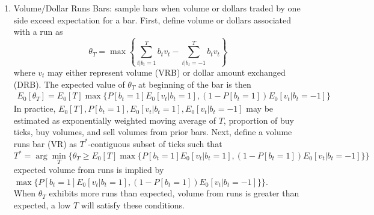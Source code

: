 \begin{remark}
\begin{enumerate}[label=\roman*.]
\begin{equation*}
\end{equation*}
The expected value of $\theta_T$ at beginning of bar is computed as
\begin{equation*}
E_0[\theta_T] = E_0[T] \max \{P[b_t = 1], 1 - P[b_t = 1] \} \nonumber
\end{equation*}
In practice, $E_0[T]$ and $P[b_t = 1]$ may be estimated as exponentially weighted moving average of $T$ and proportion of buy ticks from prior bars. Next, define TRB as $T^*$-contiguous subset of ticks such that
\begin{equation*}
T^* = \arg \min_T \{ \theta_T \geq E_0[T] \max \{P[b_t = 1], 1 - P[b_t = 1] \} \} \nonumber
\end{equation*}
where the expected count of ticks from runs is implied by $\max \{P[b_t = 1], 1 - P[b_t = 1] \}$.\\
When $\theta_T$ exhibits more runs than expected, a low $T$ will satisfy these conditions.\\
Instead of measuring length of longest sequence, count number of ticks of each side without offsetting.
\item Volume/Dollar Runs Bars: sample bars when volume or dollars traded by one side exceed expectation for a bar. First, define volume or dollars associated with a run as
\begin{equation*}
\theta_T = \max \left\{ \sum\limits_{t \vert b_t = 1}^T b_t v_t - \sum\limits_{t \vert b_t = -1}^T b_t v_t \right\} \nonumber
\end{equation*}
where $v_t$ may either represent volume (VRB) or dollar amount exchanged (DRB). The expected value of $\theta_T$ at beginning of the bar is then
\begin{align}
E_0 [\theta_T] = E_0[T] \max \{ P[b_t = 1]E_0[v_t \vert b_t = 1], (1 - P[b_t = 1]) E_0[v_t \vert b_t = -1] \} \nonumber
\end{align}
In practice, $E_0[T], P[b_t = 1], E_0[v_t \vert b_t = 1], E_0[v_t \vert b_t = -1]$ may be estimated as exponentially weighted moving average of $T$, proportion of buy ticks, buy volumes, and sell volumes from prior bars. Next, define a volume runs bar (VR) as $T^*$-contiguous subset of ticks such that
\begin{equation*}
T^* = \arg \min_T \{ \theta_T \geq E_0[T] \max \{P[b_t = 1]E_0[v_t \vert b_t = 1], (1 - P[b_t = 1]) E_0[v_t \vert b_t = -1] \} \} \nonumber
\end{equation*}
expected volume from runs is implied by $\max \{P[b_t = 1]E_0[v_t \vert b_t = 1], (1 - P[b_t = 1]) E_0[v_t \vert b_t = -1] \} \}$.\\
When $\theta_T$ exhibits more runs than expected, volume from runs is greater than expected, a low $T$ will satisfy these conditions.
\end{enumerate}
\end{remark}

